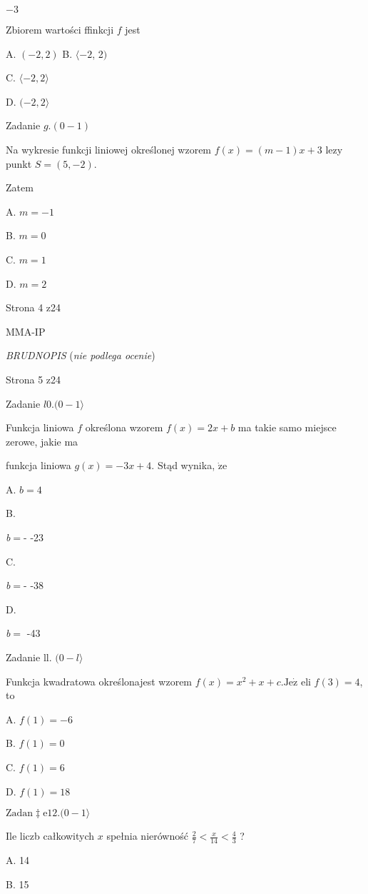 \documentclass[a4paper,12pt]{article}
\begin{document}
$-3$

Zbiorem wartości ffinkcji $f$ jest

A. $(-2,2)$ B. $\langle-2$, 2$)$

C. $\langle-2,  2\rangle$

D. $(-2,2\rangle$

Zadanie $g. (0-1)$

Na wykresie funkcji liniowej określonej wzorem $f(x)=(m-1)x+3$ lezy punkt $S=(5,-2).$

Zatem

A. $m=-1$

B. $m=0$

C. $m=1$

D. $m=2$

Strona 4 z24

MMA-IP





{\it BRUDNOPIS} ({\it nie podlega ocenie})

Strona 5 z24





Zadanie $l0. (0-1\rangle$

Funkcja liniowa $f$ określona wzorem $f(x)=2x+b$ ma takie samo miejsce zerowe, jakie ma

funkcja liniowa $g(x)=-3x+4$. Stąd wynika, $\dot{\mathrm{z}}\mathrm{e}$

A. $b=4$

B.

{\it b}$=$- -23

C.

{\it b}$=$- -38

D.

{\it b}$=$ -43

Zadanie ll. $(0-l\rangle$

Funkcja kwadratowa określonajest wzorem $f(x)=x^{2}+x+c. \mathrm{J}\mathrm{e}\dot{\mathrm{z}}$ eli $f(3)=4$, to

A. $f(1)=-6$

B. $f(1)=0$

C. $f(1)=6$

D. $f(1)=18$

$\mathrm{Z}\mathrm{a}\mathrm{d}\mathrm{a}\mathrm{n}\ddagger \mathrm{e}12. (0-1\rangle$

Ile liczb całkowitych $x$ spełnia nierówność $\displaystyle \frac{2}{7}<\frac{x}{14}<\frac{4}{3}$ ?

A. 14

B. 15
\end{document}
